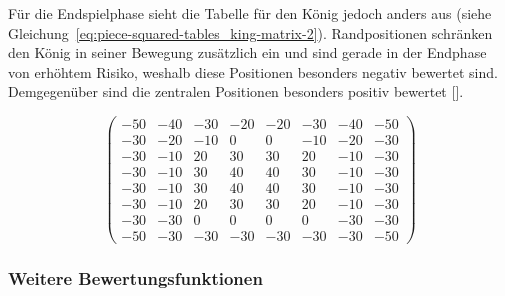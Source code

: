 \bigskip

\noindent Für die Endspielphase sieht die Tabelle für den König jedoch anders aus (siehe Gleichung~\ref{eq:piece-squared-tables_king-matrix-2}).
Randpositionen schränken den König in seiner Bewegung zusätzlich ein und sind gerade in der Endphase von erhöhtem Risiko, weshalb diese Positionen besonders negativ bewertet sind.
Demgegenüber sind die zentralen Positionen besonders positiv bewertet [\cite{Wiki2018}].

\begin{equation} \label{eq:piece-squared-tables_king-matrix-2}
\begin{pmatrix}
-50 & -40 & -30 & -20 & -20 & -30 & -40 & -50 \\
-30 & -20 & -10 & 0 & 0 & -10 & -20 & -30 \\
-30 & -10 & 20 & 30 & 30 & 20 & -10 & -30 \\
-30 & -10 & 30 & 40 & 40 & 30 & -10 & -30 \\
-30 & -10 & 30 & 40 & 40 & 30 & -10 & -30 \\
-30 & -10 & 20 & 30 & 30 & 20 & -10 & -30 \\
-30 & -30 & 0 & 0 & 0 & 0 & -30 & -30 \\
-50 & -30 & -30 & -30 & -30 & -30 & -30 & -50
\end{pmatrix}
\end{equation}


\subsubsection{Weitere Bewertungsfunktionen}

